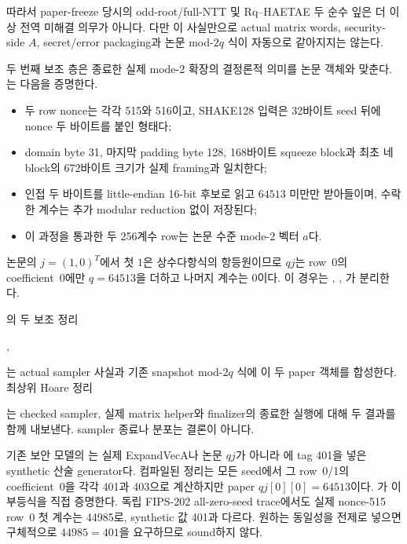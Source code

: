 따라서 paper-freeze 당시의 odd-root/full-NTT 및 Rq--HAETAE 두 순수 잎은 더
이상 전역 미해결 의무가 아니다. 다만 이 사실만으로 actual matrix words,
security-side \(A\), secret/error packaging과 논문 mod-\(2q\) 식이 자동으로
같아지지는 않는다.

두 번째 보조 층은 종료한 실제 mode-2  확장의 결정론적
의미를 논문 객체와 맞춘다.
는 다음을 증명한다.

\begin{itemize}
  \item 두 row nonce는 각각 515와 516이고, SHAKE128 입력은 32바이트 seed 뒤에
        nonce 두 바이트를 붙인 형태다;
  \item domain byte 31, 마지막 padding byte 128, 168바이트 squeeze block과
        최초 네 block의 672바이트 크기가 실제 framing과 일치한다;
  \item 인접 두 바이트를 little-endian 16-bit 후보로 읽고 \(64513\) 미만만
        받아들이며, 수락한 계수는 추가 modular reduction 없이 저장된다;
  \item 이 과정을 통과한 두 256계수 row는 논문 수준 mode-2 벡터 \(a\)다.
\end{itemize}

논문의 \(j=(1,0)^T\)에서 첫 \(1\)은 상수다항식의 항등원이므로 \(qj\)는 row~0의
coefficient~0에만 \(q=64513\)을 더하고 나머지 계수는 0이다.
이 경우는 ,
, 가 분리한다.

\allowbreak
{}의 두 보조 정리
\begin{center}
\small
{},\qquad
{}
\end{center}
는 actual sampler 사실과 기존 snapshot mod-\(2q\) 식에 이 두 paper 객체를
합성한다. 최상위 Hoare 정리
\begin{center}
\small
{}
\end{center}
는 checked sampler, 실제 matrix helper와 finalizer의 종료한 실행에 대해 두
결과를 함께 내보낸다. sampler 종료나 분포는 결론이 아니다.

\begin{boundary}
기존 보안 모델의
는 실제 ExpandVecA나 논문 \(qj\)가 아니라
에 tag 401을 넣은 synthetic 산술
generator다. 컴파일된 정리는 모든 seed에서 그 row~0/1의 coefficient~0을 각각
401과 403으로 계산하지만 paper \(qj[0][0]=64513\)이다.
가 이 부등식을 직접 증명한다.
독립 FIPS-202 all-zero-seed trace에서도 실제 nonce-515 row~0 첫 계수는 44985로,
synthetic 값 401과 다르다. 원하는 동일성을 전제로 넣으면 구체적으로
\(44985=401\)을 요구하므로 sound하지 않다.
\end{boundary}

